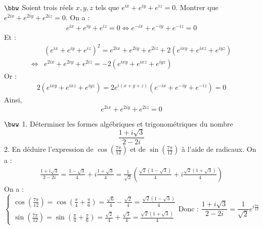 \documentclass[11pt]{article}
\begin{document}
\begin{exercice}{$\bbw$}{}
    Soient trois réels $x,y,z$ tels que $e^{ix} + e^{iy} + e^{iz} = 0$. Montrer que $e^{2ix} + e^{2iy} + e^{2iz}=0$.
    \tcblower
    On a :
    \begin{align*}
        e^{ix}+e^{iy}+e^{iz}=0\iff e^{-ix}+e^{-iy}+e^{-iz}=0
    \end{align*}
    Et :
    \begin{align*}
        &(e^{ix}+e^{iy}+e^{iz})^2 = e^{2ix} + e^{2iy} + e^{2iz} + 2(e^{ixy} + e^{ixz} + e^{iyz})\\
        \iff&e^{2ix}+e^{2iy}+e^{2iz}=-2(e^{ixy}+e^{ixz}+e^{iyz})
    \end{align*}
    Or :
    \begin{align*}
        2(e^{ixy}+e^{ixz}+e^{iyz}) = 2e^{i(x+y+z)}(e^{-ix}+e^{-iy}+e^{-iz})=0
    \end{align*}
    Ainsi,
    \begin{equation*}
        e^{2ix}+e^{2iy}+e^{2iz}=0
    \end{equation*}
\end{exercice}

\begin{exercice}{$\bww$}{}
    1. Déterminer les formes algébriques et trigonométriques du nombre
    \begin{equation*}
        \frac{1+i\sqrt{3}}{2-2i}
    \end{equation*}
    2. En déduire l'expression de $\cos(\frac{7\pi}{12})$ et de $\sin(\frac{7\pi}{12})$ à l'aide de radicaux.
    \tcblower
     On a :
    \begin{align*}
        \frac{1+i\sqrt{3}}{2-2i}=\frac{1-\sqrt{3}}{4}+i\frac{1+\sqrt{3}}{4}=\frac{1}{\sqrt{2}}\left(\frac{\sqrt{2}(1-\sqrt{3})}{4}+i\frac{\sqrt{2}(1+\sqrt{3})}{4}\right)
    \end{align*}
     On a :
    \begin{equation*}
        \begin{cases}
            \cos(\frac{7\pi}{12})=\cos(\frac{\pi}{4}+\frac{\pi}{6})=\frac{\sqrt{6}}{4}-\frac{\sqrt{2}}{4}=\frac{\sqrt{2}(1-\sqrt{3})}{4}\\
            \sin(\frac{7\pi}{12})=\sin(\frac{\pi}{4}+\frac{\pi}{6})=\frac{\sqrt{2}}{4}+\frac{\sqrt{3}}{4}=\frac{\sqrt{2}(1+\sqrt{3})}{4}
        \end{cases}
        \text{Donc : }\frac{1+i\sqrt{3}}{2-2i}=\frac{1}{\sqrt{2}}e^{i\frac{7\pi}{12}}
    \end{equation*}
\end{exercice}
\end{document}
